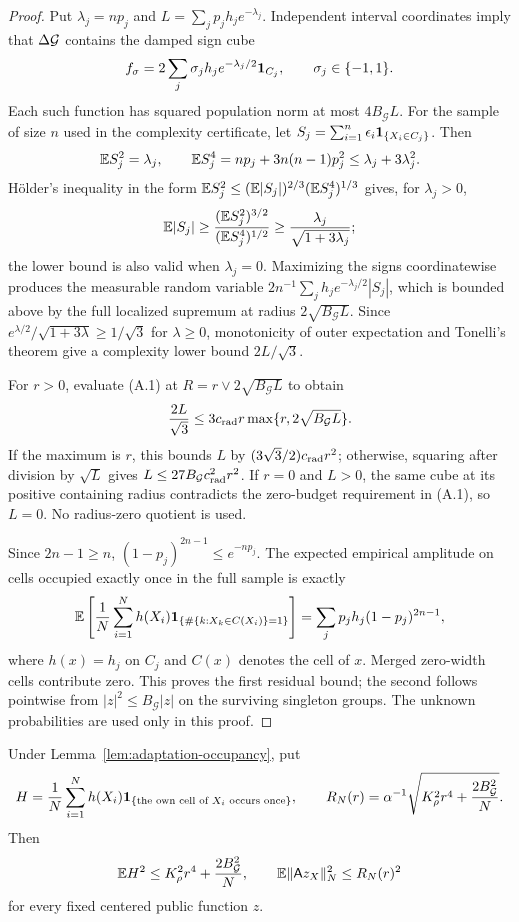 \begin{proof}
Put $\lambda_j=np_j$ and $L=\sum_jp_jh_j e^{-\lambda_j}$. Independent
interval coordinates imply that $\Delta\mathcal G$ contains the damped sign cube
\[
 f_\sigma=2\sum_j\sigma_jh_j e^{-\lambda_j/2}\mathbf 1_{C_j},
 \qquad \sigma_j\in\{-1,1\}.
\]
Each such function has squared population norm at most
$4B_{\mathcal G}L$. For the sample of size $n$ used in the complexity
certificate, let $S_j=\sum_{i=1}^n\epsilon_i\mathbf 1_{\{X_i\in C_j\}}$.
Then
\[
 \mathbb E S_j^2=\lambda_j,\qquad
 \mathbb E S_j^4=np_j+3n(n-1)p_j^2\le\lambda_j+3\lambda_j^2.
\]
H\"older's inequality in the form
$\mathbb E S_j^2\le(\mathbb E|S_j|)^{2/3}(\mathbb E S_j^4)^{1/3}$ gives, for
$\lambda_j>0$,
\[
 \mathbb E|S_j|\ge\frac{(\mathbb E S_j^2)^{3/2}}{(\mathbb E S_j^4)^{1/2}}
 \ge\frac{\lambda_j}{\sqrt{1+3\lambda_j}};
\]
the lower bound is also valid when $\lambda_j=0$. Maximizing the signs
coordinatewise produces the measurable random variable
$2n^{-1}\sum_jh_je^{-\lambda_j/2}|S_j|$, which is bounded above by
the full localized supremum at radius $2\sqrt{B_{\mathcal G}L}$.
Since $e^{\lambda/2}/\sqrt{1+3\lambda}\ge1/\sqrt3$ for
$\lambda\ge0$, monotonicity of outer expectation and Tonelli's theorem
give a complexity lower bound $2L/\sqrt3$.

For $r>0$, evaluate (A.1) at
$R=r\vee2\sqrt{B_{\mathcal G}L}$ to obtain
\[
 \frac{2L}{\sqrt3}\le3c_{\rm rad}r
       \max\{r,2\sqrt{B_{\mathcal G}L}\}.
\]
If the maximum is $r$, this bounds $L$ by
$(3\sqrt3/2)c_{\rm rad}r^2$; otherwise, squaring after division by
$\sqrt L$ gives $L\le27B_{\mathcal G}c_{\rm rad}^2r^2$.
If $r=0$ and $L>0$, the same cube at its positive containing radius
contradicts the zero-budget requirement in (A.1), so $L=0$.
No radius-zero quotient is used.

Since $2n-1\ge n$, $(1-p_j)^{2n-1}\le e^{-np_j}$. The expected
empirical amplitude on cells occupied exactly once in the full sample
is exactly
\[
 \mathbb E\left[\frac1N\sum_{i=1}^Nh(X_i)
          \mathbf 1_{\{\#\{k:X_k\in C(X_i)\}=1\}}\right]
 =\sum_jp_jh_j(1-p_j)^{2n-1},
\]
where $h(x)=h_j$ on $C_j$ and $C(x)$ denotes the cell of $x$. Merged zero-width cells
contribute zero. This proves the first residual bound; the second
follows pointwise from $|z|^2\le B_{\mathcal G}|z|$ on the surviving
singleton groups. The unknown probabilities are used only in this
proof.
\end{proof}

\begin{lemma}
\label{lem:adaptation-trimmed-residual}
Under Lemma~\ref{lem:adaptation-occupancy}, put
\[
 H=\frac1N\sum_{i=1}^Nh(X_i)
       \mathbf 1_{\{\text{the own cell of }X_i\text{ occurs once}\}},
 \qquad
 R_N(r)=\alpha^{-1}
       \sqrt{K_\rho^2r^4+\frac{2B_{\mathcal G}^2}{N}}.
\]
Then
\begin{equation}
 \mathbb E H^2\le K_\rho^2r^4+\frac{2B_{\mathcal G}^2}{N},
 \qquad
 \mathbb E\|\mathsf A z_X\|_N^2\le R_N(r)^2
 \label{eq:adaptation-trimmed-moments}
\end{equation}
for every fixed centered public function $z$.
\end{lemma}


